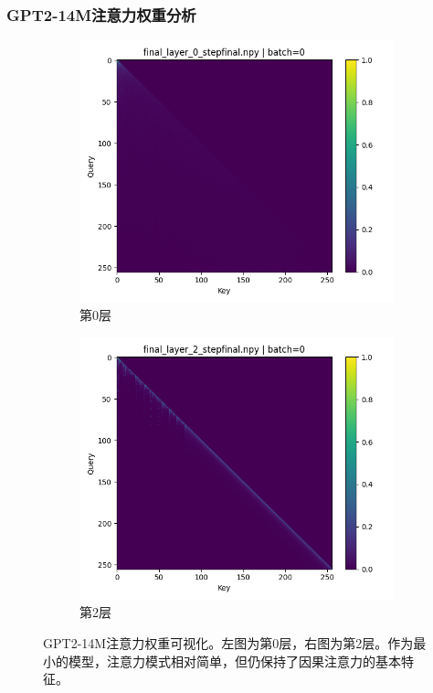 \documentclass{article}
\begin{document}
\vspace{0.5cm}

\subsubsection{GPT2-14M注意力权重分析}
\begin{figure}[H]
\centering
\begin{subfigure}[b]{0.45\textwidth}
\includegraphics[width=\textwidth]{../visualize/attentions/GPT2-14M/final_layer_0_stepfinal_b0.png}
\caption{第0层}
\label{fig:attn_14m_l0_b0}
\end{subfigure}
\hfill
\begin{subfigure}[b]{0.45\textwidth}
\includegraphics[width=\textwidth]{../visualize/attentions/GPT2-14M/final_layer_2_stepfinal_b0.png}
\caption{第2层}
\label{fig:attn_14m_l2_b0}
\end{subfigure}
\caption{GPT2-14M注意力权重可视化。左图为第0层，右图为第2层。作为最小的模型，注意力模式相对简单，但仍保持了因果注意力的基本特征。}
\label{fig:attn_14m_comparison}
\end{figure}
\end{document}
